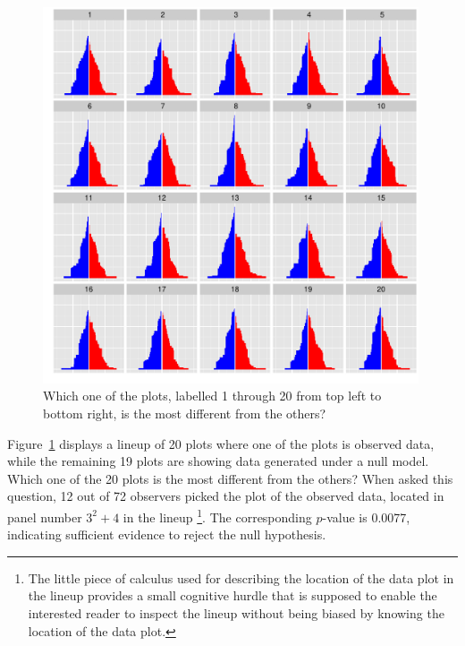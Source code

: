 \documentclass[10pt]{article}\usepackage[]{graphicx}\usepackage[]{color}
\begin{document}
\begin{figure}[hbtp] 
   \centering
   \includegraphics[width=0.99\textwidth]{electoral-5-13.pdf} 
   \caption{ \label{fig:elect} Which one of the plots, labelled 1 through 20 from top left to bottom right, is the most different from the others?}
\end{figure}

Figure~\ref{fig:elect} displays a lineup of 20 plots where one of the plots is observed data, while the remaining 19 plots are showing  data generated under a null model. Which one of the 20 plots is the most different from the others? 
When asked this question, 12 out of 72 observers picked the  plot of the observed data, located in panel number $3^2+4$ in the lineup \footnote{The little piece of calculus used for describing the location of the data plot in the lineup provides a small cognitive hurdle that is supposed to enable the interested reader to inspect the lineup without being biased by knowing the location of the data plot.}.  The corresponding $p$-value is 0.0077, indicating sufficient evidence to reject the null hypothesis. 
\end{document}
